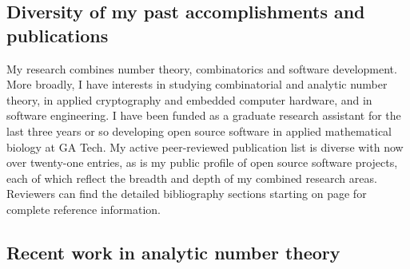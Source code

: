 \documentclass[10pt,reqno,letterpaper]{article}
\theoremstyle{plain}
\numberwithin{theorem}{section}
\theoremstyle{definition}
\begin{document}
\subsection{Diversity of my past accomplishments and publications}

My research combines number theory, combinatorics and software development. 
More broadly, I have interests in studying combinatorial and analytic number theory, 
in applied cryptography and embedded computer hardware, and in software engineering. 
I have been funded as a graduate research assistant for the last three years or so developing 
open source software in applied mathematical biology at GA Tech. 
My active peer-reviewed publication list is diverse with now over twenty-one entries, as is my 
public profile of open source software projects, each of which reflect the breadth and 
depth of my combined research areas. 
Reviewers can find the detailed bibliography sections starting on page 
\pageref{page_Section_BibliographyB} for complete reference information. 

\subsection{Recent work in analytic number theory}
\label{subSection_PriorWork_MertensFunctionMx} 
\end{document}
